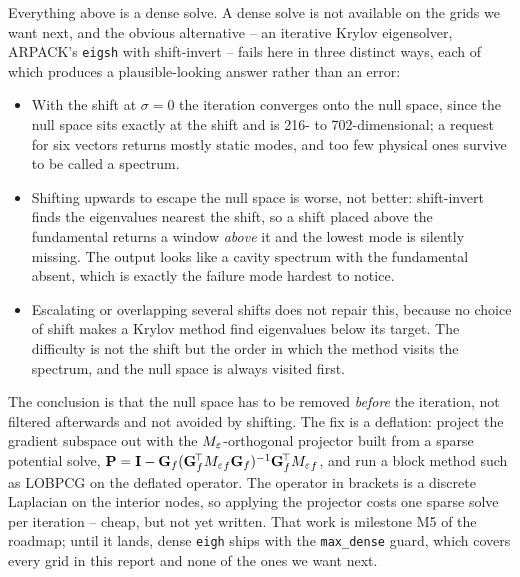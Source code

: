 Everything above is a dense solve. A dense solve is not available on the grids we want next, and
the obvious
alternative -- an iterative Krylov eigensolver, ARPACK's \texttt{eigsh} with shift-invert -- fails
here in three
distinct ways, each of which produces a plausible-looking answer rather than an error:
\begin{itemize}[leftmargin=1.4em,itemsep=2pt,topsep=2pt]
  \item With the shift at $\sigma=0$ the iteration converges onto the null space, since the null
space sits
        exactly at the shift and is 216- to 702-dimensional; a request for six vectors returns
mostly static
        modes, and too few physical ones survive to be called a spectrum.
  \item Shifting upwards to escape the null space is worse, not better: shift-invert finds the
eigenvalues
        nearest the shift, so a shift placed above the fundamental returns a window \emph{above} it
and the
        lowest mode is silently missing. The output looks like a cavity spectrum with the
fundamental absent,
        which is exactly the failure mode hardest to notice.
  \item Escalating or overlapping several shifts does not repair this, because no choice of shift
makes a Krylov
        method find eigenvalues below its target. The difficulty is not the shift but the order in
which the
        method visits the spectrum, and the null space is always visited first.
\end{itemize}
The conclusion is that the null space has to be removed \emph{before} the iteration, not filtered
afterwards and
not avoided by shifting. The fix is a deflation: project the gradient subspace out with the
${M_{\varepsilon}}$-orthogonal
projector built from a sparse potential solve,
$\mathbf{P}=\mathbf{I}-\mathbf{G}_f(\mathbf{G}_f^{\!\top}{M_{\varepsilon}}_f\mathbf{G}_f)^{-1}
\mathbf{G}_f^{\!\top}{M_{\varepsilon}}_f$, and run a block method such as LOBPCG on the deflated operator. The
operator in brackets
is a discrete Laplacian on the interior nodes, so applying the projector costs one sparse solve per
iteration --
cheap, but not yet written. That work is milestone M5 of the roadmap; until it lands, dense
\texttt{eigh} ships
with the \texttt{max\_dense} guard, which covers every grid in this report and none of the ones we
want next.

